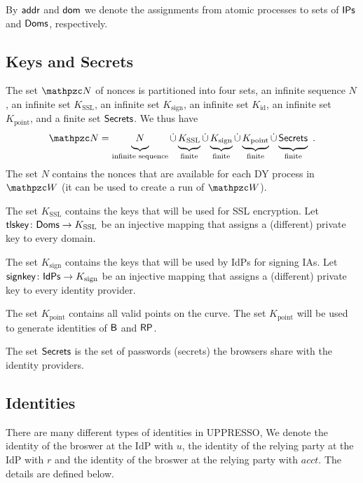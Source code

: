 \documentclass[letterpaper,onecolumn,10pt]{article}
\begin{document}
By $\mathsf{addr}$ and $\mathsf{dom}$ we denote the assignments from
atomic processes to sets of $\mathsf{IPs}$ and $\mathsf{Doms}$, respectively.

\subsection{Keys and Secrets} 
The set $\nonces$ of nonces is partitioned into four sets, 
an infinite sequence $N$, 
an infinite set $K_\text{SSL}$, 
an infinite set $K_\text{sign}$, 
an infinite set $K_\text{id}$, 
an infinite set $K_\text{point}$, 
and a finite set $\mathsf{Secrets}$. 
We thus have
\begin{align*}
\def\hereMaxHeightPhantom{\vphantom{K_{\text{p}}^\bidsystem}}
\nonces = 
\underbrace{N\hereMaxHeightPhantom}_{\text{infinite sequence}} 
\dot\cup \underbrace{K_{\text{SSL}}\hereMaxHeightPhantom}_{\text{finite}} 
\dot\cup \underbrace{K_{\text{sign}}\hereMaxHeightPhantom}_{\text{finite}}
\dot\cup \underbrace{K_{\text{point}}\hereMaxHeightPhantom}_{\text{finite}}  
\dot\cup \underbrace{\RPSecrets\hereMaxHeightPhantom}_{\text{finite}}\ .
\end{align*}
The set $N$ contains the nonces that are available for each DY process
in $\bidsystem$ (it can be used to create a run of $\bidsystem$). 

The set $K_\text{SSL}$ contains the keys that will be used for SSL
encryption. Let $\mathsf{tlskey}\colon \mathsf{Doms} \to K_\text{SSL}$ be an injective
mapping that assigns a (different) private key to every domain.

The set $K_\text{sign}$ contains the keys that will be used by IdPs
for signing IAs. Let $\mathsf{signkey}\colon \mathsf{IdPs} \to K_\text{sign}$
be an injective mapping that assigns a (different) private key to every identity
provider.

The set $K_\text{point}$ contains all valid points on the curve. 
The set $K_\text{point}$ will be used to generate identities of $\mathsf{B}$ and $\mathsf{RP}$.

The set $\mathsf{Secrets}$ is the set of passwords (secrets) 
the browsers share with the identity providers. 

\subsection{Identities}\label{app:uppresso-identities}
There are many different types of identities in UPPRESSO, 
We denote the identity of the broswer at the IdP with $u$,
the identity of the relying party at the IdP with $r$ and 
the identity of the broswer at the relying party with $acct$.
The details are defined below.
\end{document}
